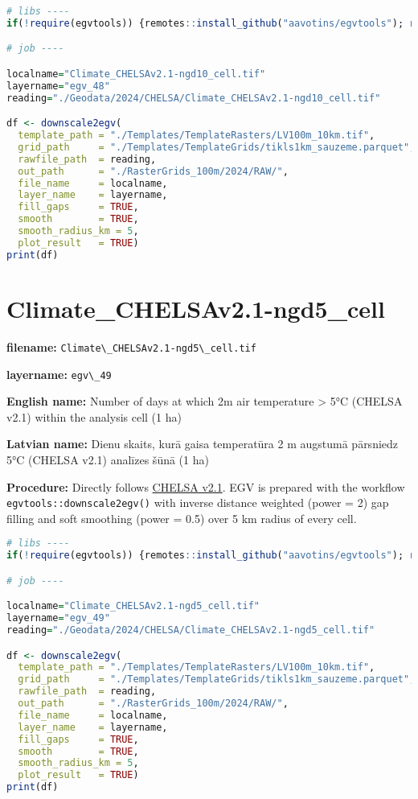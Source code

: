 \documentclass[
]{book}
\newcommand{\passthrough}[1]{#1}
\begin{document}
\begin{lstlisting}[language=R]
# libs ----
if(!require(egvtools)) {remotes::install_github("aavotins/egvtools"); require(egvtools)}

# job ----

localname="Climate_CHELSAv2.1-ngd10_cell.tif"
layername="egv_48"
reading="./Geodata/2024/CHELSA/Climate_CHELSAv2.1-ngd10_cell.tif"

df <- downscale2egv(
  template_path = "./Templates/TemplateRasters/LV100m_10km.tif",
  grid_path     = "./Templates/TemplateGrids/tikls1km_sauzeme.parquet",
  rawfile_path  = reading,
  out_path      = "./RasterGrids_100m/2024/RAW/",
  file_name     = localname,
  layer_name    = layername,
  fill_gaps     = TRUE,
  smooth        = TRUE,
  smooth_radius_km = 5,
  plot_result   = TRUE)
print(df)
\end{lstlisting}

\section{Climate\_CHELSAv2.1-ngd5\_cell}\label{ch06.049}

\textbf{filename:} \passthrough{\lstinline!Climate\_CHELSAv2.1-ngd5\_cell.tif!}

\textbf{layername:} \passthrough{\lstinline!egv\_49!}

\textbf{English name:} Number of days at which 2m air temperature \textgreater{} 5°C (CHELSA v2.1) within the analysis cell (1 ha)

\textbf{Latvian name:} Dienu skaits, kurā gaisa temperatūra 2 m augstumā pārsniedz 5°C (CHELSA v2.1) analīzes šūnā (1 ha)

\textbf{Procedure:} Directly follows \hyperref[Ch04.11]{CHELSA v2.1}. EGV is prepared with the
workflow \passthrough{\lstinline!egvtools::downscale2egv()!} with inverse distance weighted (power = 2)
gap filling and soft smoothing (power = 0.5) over 5 km radius of every cell.

\begin{lstlisting}[language=R]
# libs ----
if(!require(egvtools)) {remotes::install_github("aavotins/egvtools"); require(egvtools)}

# job ----

localname="Climate_CHELSAv2.1-ngd5_cell.tif"
layername="egv_49"
reading="./Geodata/2024/CHELSA/Climate_CHELSAv2.1-ngd5_cell.tif"

df <- downscale2egv(
  template_path = "./Templates/TemplateRasters/LV100m_10km.tif",
  grid_path     = "./Templates/TemplateGrids/tikls1km_sauzeme.parquet",
  rawfile_path  = reading,
  out_path      = "./RasterGrids_100m/2024/RAW/",
  file_name     = localname,
  layer_name    = layername,
  fill_gaps     = TRUE,
  smooth        = TRUE,
  smooth_radius_km = 5,
  plot_result   = TRUE)
print(df)
\end{lstlisting}
\end{document}
